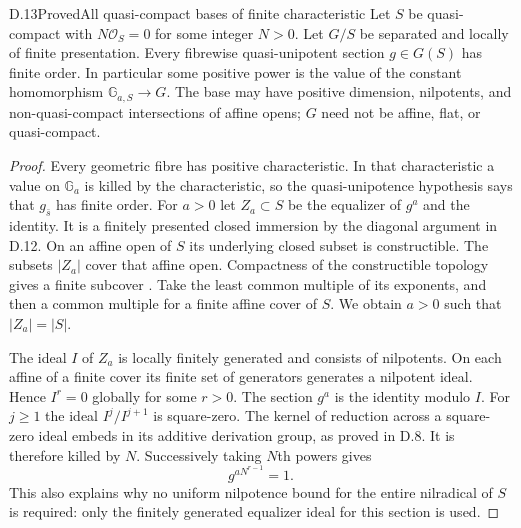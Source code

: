 \begin{statement}{D.13}{Proved}{All quasi-compact bases of finite characteristic}
Let $S$ be quasi-compact with $N\mathcal O_S=0$ for some integer
$N>0$. Let $G/S$ be separated and locally of finite presentation.
Every fibrewise quasi-unipotent section $g\in G(S)$ has finite order.
In particular some positive power is the value of the constant
homomorphism $\mathbb G_{a,S}\to G$. The base may have positive
dimension, nilpotents, and non-quasi-compact intersections of affine opens;
$G$ need not be affine, flat, or quasi-compact.
\end{statement}
\begin{proof}
Every geometric fibre has positive characteristic. In that characteristic
a value on $\mathbb G_a$ is killed by the characteristic, so the
quasi-unipotence hypothesis says that $g_{\bar s}$ has finite order.
For $a>0$ let $Z_a\subset S$ be the equalizer of $g^a$ and the identity.
It is a finitely presented closed immersion by the diagonal argument
in D.12. On an affine open of $S$ its underlying closed subset is
constructible. The subsets $|Z_a|$ cover that affine open. Compactness
of the constructible topology gives a finite subcover
\citep[Lemma 5.23.2, Tag 0901]{DN_StacksConstructible}.
Take the least common multiple of its exponents, and then a common
multiple for a finite affine cover of $S$. We obtain $a>0$ such that
$|Z_a|=|S|$.

The ideal $I$ of $Z_a$ is locally finitely generated and consists of
nilpotents. On each affine of a finite cover its finite set of generators
generates a nilpotent ideal. Hence $I^r=0$ globally for some $r>0$.
The section $g^a$ is the identity modulo $I$. For $j\ge1$ the ideal
$I^j/I^{j+1}$ is square-zero. The kernel of reduction across a
square-zero ideal embeds in its additive derivation group, as proved
in D.8. It is therefore killed by $N$. Successively taking $N$th
powers gives
\[
                         g^{aN^{r-1}}=1.
\]
This also explains why no uniform nilpotence bound for the entire
nilradical of $S$ is required: only the finitely generated equalizer
ideal for this section is used.
\end{proof}

